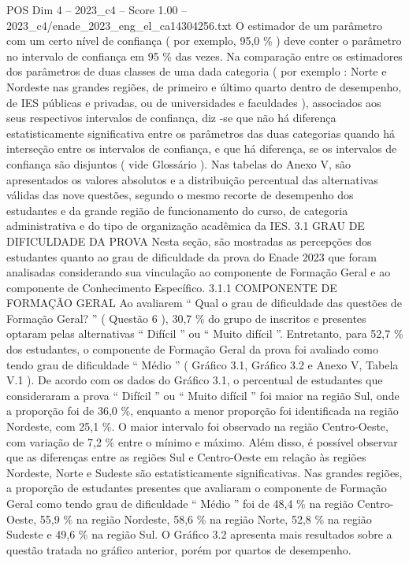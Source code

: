 \begin{textsample}{POS Dim 4 – 2023\_c4 – Score 1.00 – 2023\_c4/enade\_2023\_eng\_el\_ca14304256.txt}
O estimador de um parâmetro com um certo nível de confiança ( por exemplo, 95,0 \% ) deve conter o parâmetro no intervalo de confiança em 95 \% das vezes.
Na comparação entre os estimadores dos parâmetros de duas classes de uma dada categoria ( por exemplo : Norte e Nordeste nas grandes regiões, de primeiro e último quarto dentro de desempenho, de IES públicas e privadas, ou de universidades e faculdades ), associados aos seus respectivos intervalos de confiança, diz -se que não há diferença estatisticamente significativa entre os parâmetros das duas categorias quando há interseção entre os intervalos de confiança, e que há diferença, se os intervalos de confiança são disjuntos ( vide Glossário ).
Nas tabelas do Anexo V, são apresentados os valores absolutos e a distribuição percentual das alternativas válidas das nove questões, segundo o mesmo recorte de desempenho dos estudantes e da grande região de funcionamento do curso, de categoria administrativa e do tipo de organização acadêmica da IES. 3.1 GRAU DE DIFICULDADE DA PROVA Nesta seção, são mostradas as percepções dos estudantes quanto ao grau de dificuldade da prova do Enade 2023 que foram analisadas considerando sua vinculação ao componente de Formação Geral e ao componente de Conhecimento Específico. 3.1.1 COMPONENTE DE FORMAÇÃO GERAL Ao avaliarem “ Qual o grau de dificuldade das questões de Formação Geral? ” ( Questão 6 ), 30,7 \% do grupo de inscritos e presentes optaram pelas alternativas “ Difícil ” ou “ Muito difícil ”.
Entretanto, para 52,7 \% dos estudantes, o componente de Formação Geral da prova foi avaliado como tendo grau de dificuldade “ Médio ” ( Gráfico 3.1, Gráfico 3.2 e Anexo V, Tabela V.1 ).
De acordo com os dados do Gráfico 3.1, o percentual de estudantes que consideraram a prova “ Difícil ” ou “ Muito difícil ” foi maior na região Sul, onde a proporção foi de 36,0 \%, enquanto a menor proporção foi identificada na região Nordeste, com 25,1 \%.
O maior intervalo foi observado na região Centro-Oeste, com variação de 7,2 \% entre o mínimo e máximo.
Além disso, é possível observar que as diferenças entre as regiões Sul e Centro-Oeste em relação às regiões Nordeste, Norte e Sudeste são estatisticamente significativas.
Nas grandes regiões, a proporção de estudantes presentes que avaliaram o componente de Formação Geral como tendo grau de dificuldade “ Médio ” foi de 48,4 \% na região Centro-Oeste, 55,9 \% na região Nordeste, 58,6 \% na região Norte, 52,8 \% na região Sudeste e 49,6 \% na região Sul.
O Gráfico 3.2 apresenta mais resultados sobre a questão tratada no gráfico anterior, porém por quartos de desempenho.

\end{textsample}

